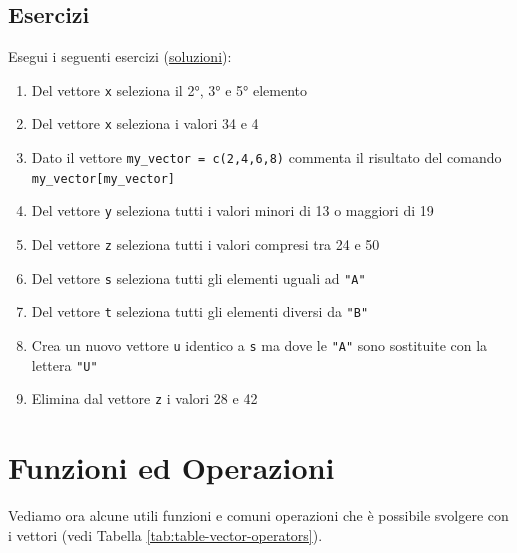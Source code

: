 \documentclass[
]{book}
\providecommand{\tightlist}{%
  \setlength{\itemsep}{0pt}\setlength{\parskip}{0pt}}
\begin{document}
\hypertarget{esercizi-3}{%
\subsection*{Esercizi}\label{esercizi-3}}

Esegui i seguenti esercizi (\href{https://github.com/psicostat/Introduction2R/blob/master/exercises/chapter-07.R}{soluzioni}):

\begin{enumerate}
\def\labelenumi{\arabic{enumi}.}
\tightlist
\item
  Del vettore \texttt{x} seleziona il 2°, 3° e 5° elemento
\item
  Del vettore \texttt{x} seleziona i valori 34 e 4
\item
  Dato il vettore \texttt{my\_vector\ =\ c(2,4,6,8)} commenta il risultato del comando \texttt{my\_vector{[}my\_vector{]}}
\item
  Del vettore \texttt{y} seleziona tutti i valori minori di 13 o maggiori di 19
\item
  Del vettore \texttt{z} seleziona tutti i valori compresi tra 24 e 50
\item
  Del vettore \texttt{s} seleziona tutti gli elementi uguali ad \texttt{"A"}
\item
  Del vettore \texttt{t} seleziona tutti gli elementi diversi da \texttt{"B"}
\item
  Crea un nuovo vettore \texttt{u} identico a \texttt{s} ma dove le \texttt{"A"} sono sostituite con la lettera \texttt{"U"}
\item
  Elimina dal vettore \texttt{z} i valori 28 e 42
\end{enumerate}

\hypertarget{vector-functions}{%
\section{Funzioni ed Operazioni}\label{vector-functions}}

Vediamo ora alcune utili funzioni e comuni operazioni che è possibile svolgere con i vettori (vedi Tabella \ref{tab:table-vector-operators}).
\end{document}
